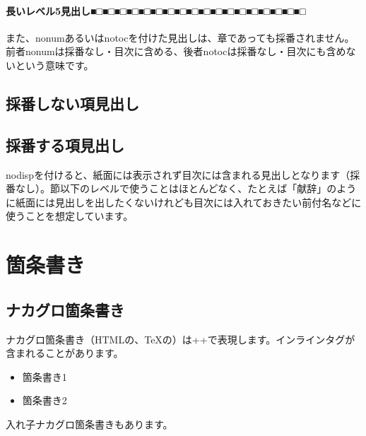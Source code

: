 \paragraph*{長いレベル5見出し■□■□■□■□■□■□■□■□■□■□■□■□■□■□■□■□■□■□}
\label{sec:1-2-1-1-1}

また、nonumあるいはnotocを付けた見出しは、章であっても採番されません。前者nonumは採番なし・目次に含める、後者notocは採番なし・目次にも含めないという意味です。

\subsection*{採番しない項見出し}

\subsection{採番する項見出し}
\label{sec:1-2-2}

nodispを付けると、紙面には表示されず目次には含まれる見出しとなります（採番なし）。節以下のレベルで使うことはほとんどなく、たとえば「献辞」のように紙面には見出しを出したくないけれども目次には入れておきたい前付名などに使うことを想定しています。


\section{箇条書き}
\label{sec:1-3}

\subsection{ナカグロ箇条書き}
\label{sec:1-3-1}

ナカグロ箇条書き（HTMLの、TeXの）は+\reviewtt{*}+で表現します。インラインタグが含まれることがあります。

\begin{itemize}
\item 箇条書き1
\item 箇条書き2
\end{itemize}

入れ子ナカグロ箇条書きもあります。

